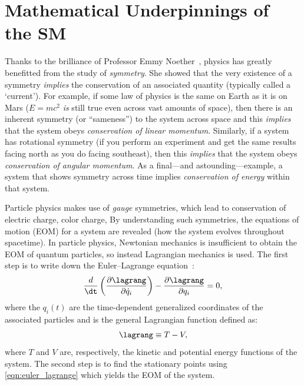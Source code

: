 \section{Mathematical Underpinnings of the SM}
\label{sec:sm_math}

Thanks to the brilliance of Professor Emmy Noether~\cite{Noether1918}, physics has greatly benefitted from the study of \emph{symmetry}.
She showed that the very existence of a symmetry \emph{implies} the conservation of an associated quantity (typically called a `current').
For example, if some law of physics is the same on Earth as it is on Mars (\eg $E = mc^2$ \emph{is} still true even across vast amounts of space), then there is an inherent symmetry (or ``sameness'') to the system across space and this \emph{implies} that the system obeys \emph{conservation of linear momentum}.
Similarly, if a system has rotational symmetry (\eg if you perform an experiment and get the same results facing north as you do facing southeast), then this \emph{implies} that the system obeys \emph{conservation of angular momentum}.
As a final---and astounding---example, a system that shows symmetry across time implies \emph{conservation of energy} within that system.

Particle physics makes use of \emph{gauge} symmetries, which lead to conservation of electric charge, color charge, \etc
By understanding such symmetries, the equations of motion (EOM) for a system are revealed (\ie how the system evolves throughout spacetime).
In particle physics, Newtonian mechanics is insufficient to obtain the EOM of quantum particles, so instead Lagrangian mechanics is used.
The first step is to write down the Euler--Lagrange equation~\cite{Halzen:1984mc}:
\begin{equation}
    \frac{d}{\dt}
    \left( \frac{\partial \lagrang}{\partial \dot{q}_i} \right)
    -
    \frac{\partial \lagrang}{\partial q_i} = 0,
    \label{eqn:euler_lagrange}
\end{equation}
where the $q_i(t)$ are the time-dependent generalized coordinates of the associated particles
and \lagrang is the general Lagrangian function defined as:
\begin{equation*}
    \lagrang \equiv T - V,
\end{equation*}
where $T$ and $V$ are, respectively, the kinetic and potential energy functions of the system.
The second step is to find the stationary points using \cref{eqn:euler_lagrange} which yields the EOM of the system.

